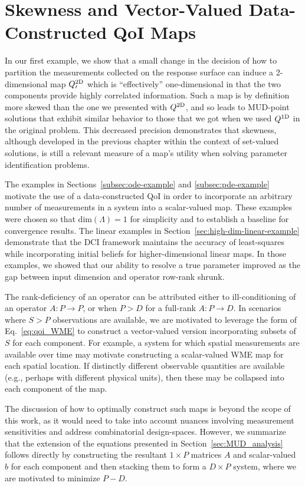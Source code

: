 \section{Skewness and Vector-Valued Data-Constructed QoI Maps}
In our first example, we show that a small change in the decision of how to partition the measurements collected on the response surface can induce a 2-dimensional map $Q^\text{2D}_\prime$ which is ``effectively'' one-dimensional in that the two components provide highly correlated information.
Such a map is by definition more skewed than the one we presented with $Q^\text{2D}$, and so leads to MUD-point solutions that exhibit similar behavior to those that we got when we used $Q^\text{1D}$ in the original problem.
This decreased precision demonstrates that skewness, although developed in the previous chapter within the context of set-valued solutions, is still a relevant measure of a map's utility when solving parameter identification problems.

The examples in Sections~\ref{subsec:ode-example} and \ref{subsec:pde-example} motivate the use of a data-constructed QoI in order to incorporate an arbitrary number of measurements in a system into a scalar-valued map.
These examples were chosen so that $\text{dim}({\Lambda}) = 1$ for simplicity and to establish a baseline for convergence results.
The linear examples in Section~\ref{sec:high-dim-linear-example} demonstrate that the DCI framework maintains the accuracy of least-squares while incorporating initial beliefs for higher-dimensional linear maps.
In those examples, we showed that our ability to resolve a true parameter improved as the gap between input dimension and operator row-rank shrunk.

The rank-deficiency of an operator can be attributed either to ill-conditioning of an operator $A:P\to P$, or when $P>D$ for a full-rank $A:P\to D$.
In scenarios where $S>P$ observations are available, we are motivated to leverage the form of Eq.~\eqref{eq:qoi_WME} to construct a vector-valued version incorporating subsets of $S$ for each component.
For example, a system for which spatial measurements are available over time may motivate constructing a scalar-valued WME map for each spatial location.
If distinctly different observable quantities are available (e.g., perhaps with different physical units), then these may be collapsed into each component of the map.

The discussion of how to optimally construct such maps is beyond the scope of this work, as it would need to take into account nuances involving measurement sensitivities and address combinatorial design-spaces.
However, we summarize that the extension of the equations presented in Section~\ref{sec:MUD_analysis} follows directly by constructing the resultant $1\times P$ matrices $A$ and scalar-valued $b$ for each component and then stacking them to form a $D\times P$ system, where we are motivated to minimize $P-D$.

